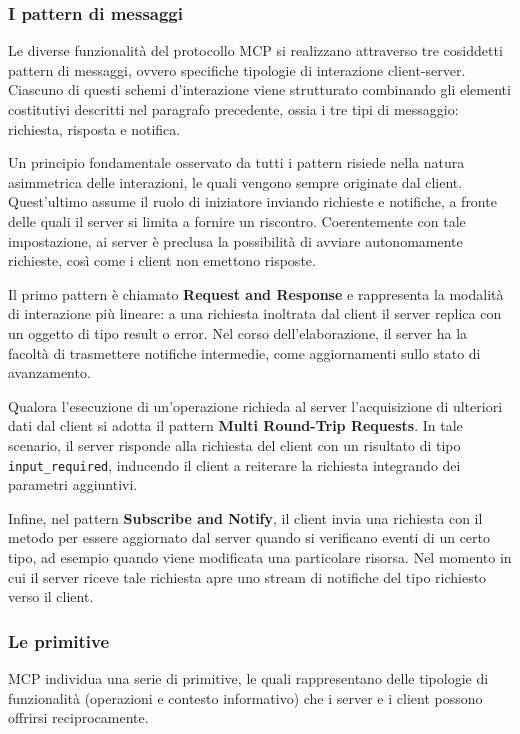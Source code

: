 \subsubsection{I pattern di messaggi}\label{i-pattern-di-messaggi}

Le diverse funzionalità del protocollo MCP si realizzano attraverso tre
cosiddetti pattern di messaggi, ovvero specifiche tipologie di
interazione client-server. Ciascuno di questi schemi d'interazione viene
strutturato combinando gli elementi costitutivi descritti nel paragrafo
precedente, ossia i tre tipi di messaggio: richiesta, risposta e
notifica.

Un principio fondamentale osservato da tutti i pattern risiede nella
natura asimmetrica delle interazioni, le quali vengono sempre originate
dal client. Quest'ultimo assume il ruolo di iniziatore inviando
richieste e notifiche, a fronte delle quali il server si limita a
fornire un riscontro. Coerentemente con tale impostazione, ai server è
preclusa la possibilità di avviare autonomamente richieste, così come i
client non emettono risposte.

Il primo pattern è chiamato \textbf{Request and Response} e rappresenta
la modalità di interazione più lineare: a una richiesta inoltrata dal
client il server replica con un oggetto di tipo result o error. Nel
corso dell'elaborazione, il server ha la facoltà di trasmettere
notifiche intermedie, come aggiornamenti sullo stato di avanzamento.

Qualora l'esecuzione di un'operazione richieda al server l'acquisizione
di ulteriori dati dal client si adotta il pattern \textbf{Multi
Round-Trip Requests}. In tale scenario, il server risponde alla
richiesta del client con un risultato di tipo \texttt{input\_required},
inducendo il client a reiterare la richiesta integrando dei parametri
aggiuntivi.

Infine, nel pattern \textbf{Subscribe and Notify}, il client invia una
richiesta con il metodo  per essere aggiornato dal
server quando si verificano eventi di un certo tipo, ad esempio quando
viene modificata una particolare risorsa. Nel momento in cui il server
riceve tale richiesta apre uno stream di notifiche del tipo richiesto
verso il client.

\subsubsection{Le primitive}\label{le-primitive}

MCP individua una serie di primitive, le quali rappresentano delle
tipologie di funzionalità (operazioni e contesto informativo) che i
server e i client possono offrirsi reciprocamente.

